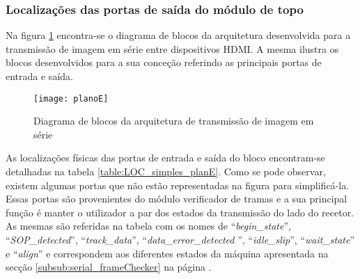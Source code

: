 \subsubsection*{Localizações das portas de saída do módulo de topo} \label{subsub:serial_locs_planE}

Na figura \ref{fig:planoE} encontra-se o diagrama de blocos da arquitetura desenvolvida para a transmissão de imagem em série entre dispositivos HDMI. A mesma ilustra os blocos desenvolvidos para a sua conceção referindo as principais portas de entrada e saída.

\begin{figure}[h!]
	\begin{center}
		\leavevmode
		\texttt{[image: planoE]}
		\captionsetup{width=1.0\linewidth}
		\caption[Diagrama de blocos da arquitetura de transmissão de imagem em série]{Diagrama de blocos da arquitetura de transmissão de imagem em série}
		\label{fig:planoE}
	\end{center}
\end{figure}

As localizações físicas das portas de entrada e saída do bloco encontram-se detalhadas na tabela \ref{table:LOC_simples_planE}. Como se pode observar, existem algumas portas que não estão representadas na figura \label{fig:planE} para simplificá-la. Essas portas são provenientes do módulo verificador de tramas e a sua principal função é manter o utilizador a par dos estados da transmissão do lado do recetor.  As mesmas são referidas na tabela com os nomes de ``\textit{begin\_state}'', ``\textit{SOP\_detected}'', ``\textit{track\_data}'', ``\textit{data\_error\_detected }'', ``\textit{idle\_slip}'', ``\textit{wait\_state}'' e ``\textit{align}'' e correspondem aos diferentes estados da máquina apresentada na secção \ref{subsub:serial_frameChecker} na página \pageref{subsub:serial_frameChecker}.

